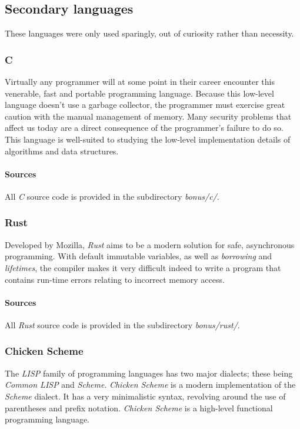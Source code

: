 \documentclass{article}
\begin{document}
\newpage


\subsection{Secondary languages}
These languages were only used sparingly, out of curiosity rather than necessity.

\subsubsection{C}
Virtually any programmer will at some point in their career encounter this venerable, fast and portable programming
language. Because this low-level language doesn't use a garbage collector, the programmer must exercise great caution
with the manual management of memory. Many security problems that affect us today are a direct consequence of the
programmer's failure to do so. This language is well-suited to studying the low-level implementation details of
algorithms and data structures.

\paragraph{Sources}
All {\em C} source code is provided in the subdirectory {\em bonus/c/}.

\subsubsection{Rust}
Developed by Mozilla, {\em Rust} aims to be a modern solution for safe, asynchronous programming.
With default immutable variables, as well as {\em borrowing} and {\em lifetimes}, the compiler makes it very
difficult indeed to write a program that contains run-time errors relating to incorrect memory access.

\paragraph{Sources}
All {\em Rust} source code is provided in the subdirectory {\em bonus/rust/}.

\subsubsection{Chicken Scheme}
The {\em LISP} family of programming languages has two major dialects; these being {\em Common LISP} and {\em Scheme}.
{\em Chicken Scheme} is a modern implementation of the {\em Scheme} dialect. It has a very minimalistic syntax,
revolving around the use of parentheses and prefix notation. {\em Chicken Scheme} is a high-level functional
programming language.
\end{document}
